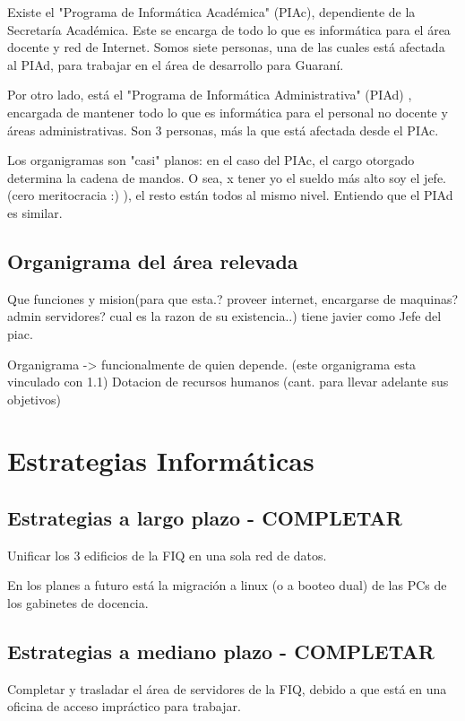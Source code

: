 \documentclass[10pt,a4paper,final]{article}
\begin{document}
Existe el "Programa de Informática Académica" (PIAc), dependiente de la Secretaría Académica. Este se encarga de todo lo que es informática para el área docente y red de Internet. Somos siete personas, una de las cuales está afectada al PIAd, para trabajar en el área de desarrollo para Guaraní.

Por otro lado, está el "Programa de Informática Administrativa" (PIAd) , encargada de mantener todo lo que es informática para el personal no docente y áreas administrativas. Son 3 personas, más la que está afectada desde el PIAc.

Los organigramas son "casi" planos: en el caso del PIAc, el cargo otorgado determina la cadena de mandos. O sea, x tener yo el sueldo más alto soy el jefe.  (cero meritocracia :) ), el resto están todos al mismo nivel. Entiendo que el PIAd es similar.

\subsection{Organigrama del área relevada}
Que funciones y  mision(para que esta.? proveer internet, encargarse de maquinas? admin servidores? cual es la razon de su existencia..) tiene javier como Jefe del piac.

    Organigrama -> funcionalmente de quien depende. (este organigrama esta vinculado con 1.1)
          Dotacion de recursos humanos (cant. para llevar adelante sus objetivos)
\section{Estrategias Informáticas}
\subsection{Estrategias a largo plazo - COMPLETAR}
Unificar los 3 edificios de la FIQ en una sola red de datos.

En los planes a futuro está la migración a linux (o a booteo dual) de las PCs de los gabinetes de docencia.
\subsection{Estrategias a mediano plazo - COMPLETAR}
Completar y trasladar el área de servidores de la FIQ, debido a que está en una oficina de acceso impráctico para trabajar.
\end{document}
